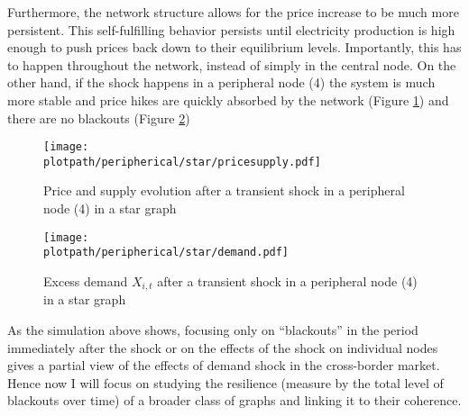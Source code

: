 Furthermore, the network structure allows for the price increase to be much more persistent. This self-fulfilling behavior persists until electricity production is high enough to push prices back down to their equilibrium levels. Importantly, this has to happen throughout the network, instead of simply in the central node. On the other hand, if the shock happens in a peripheral node (4) the system is much more stable and price hikes are quickly absorbed by the network (Figure \ref{fig:transshockper_star}) and there are no blackouts (Figure \ref{fig:demandtransshockper_star})

\begin{figure}[H]
    \centering
    \texttt{[image: \\plotpath/peripherical/star/pricesupply.pdf]}
    \caption{Price and supply evolution after a transient shock in a peripheral node (4) in a star graph} \label{fig:transshockper_star}
\end{figure}

\begin{figure}[H]
    \centering
    \texttt{[image: \\plotpath/peripherical/star/demand.pdf]}
    \caption{Excess demand $X_{i, t}$ after a transient shock in a peripheral node (4) in a star graph} \label{fig:demandtransshockper_star}
\end{figure}


As the simulation above shows, focusing only on ``blackouts'' in the period immediately after the shock or on the effects of the shock on individual nodes gives a partial view of the effects of demand shock in the cross-border market. Hence now I will focus on studying the resilience (measure by the total level of blackouts over time) of a broader class of graphs and linking it to their coherence.

